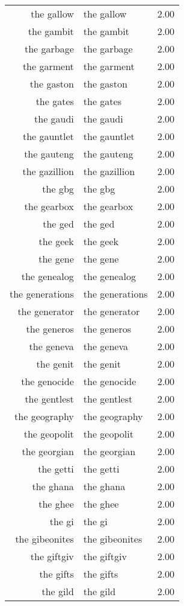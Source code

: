 \begin{table}[ht]
\begin{tabular}{rlr}
  the gallow & the gallow & 2.00 \\ 
  the gambit & the gambit & 2.00 \\ 
  the garbage & the garbage & 2.00 \\ 
  the garment & the garment & 2.00 \\ 
  the gaston & the gaston & 2.00 \\ 
  the gates & the gates & 2.00 \\ 
  the gaudi & the gaudi & 2.00 \\ 
  the gauntlet & the gauntlet & 2.00 \\ 
  the gauteng & the gauteng & 2.00 \\ 
  the gazillion & the gazillion & 2.00 \\ 
  the gbg & the gbg & 2.00 \\ 
  the gearbox & the gearbox & 2.00 \\ 
  the ged & the ged & 2.00 \\ 
  the geek & the geek & 2.00 \\ 
  the gene & the gene & 2.00 \\ 
  the genealog & the genealog & 2.00 \\ 
  the generations & the generations & 2.00 \\ 
  the generator & the generator & 2.00 \\ 
  the generos & the generos & 2.00 \\ 
  the geneva & the geneva & 2.00 \\ 
  the genit & the genit & 2.00 \\ 
  the genocide & the genocide & 2.00 \\ 
  the gentlest & the gentlest & 2.00 \\ 
  the geography & the geography & 2.00 \\ 
  the geopolit & the geopolit & 2.00 \\ 
  the georgian & the georgian & 2.00 \\ 
  the getti & the getti & 2.00 \\ 
  the ghana & the ghana & 2.00 \\ 
  the ghee & the ghee & 2.00 \\ 
  the gi & the gi & 2.00 \\ 
  the gibeonites & the gibeonites & 2.00 \\ 
  the giftgiv & the giftgiv & 2.00 \\ 
  the gifts & the gifts & 2.00 \\ 
  the gild & the gild & 2.00 \\ 

\end{tabular}
\end{table}
